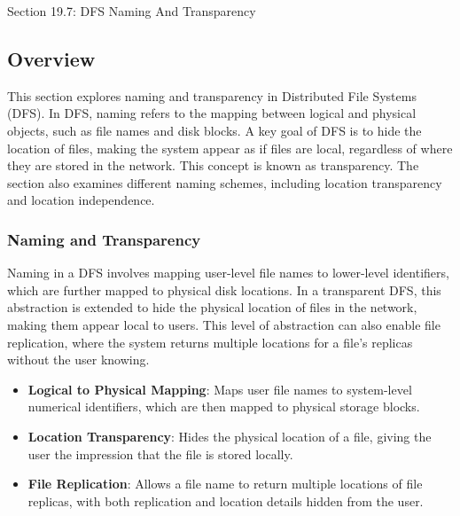 \begin{notes}{Section 19.7: DFS Naming And Transparency}
    \subsection*{Overview}

    This section explores naming and transparency in Distributed File Systems (DFS). In DFS, naming refers to the mapping between logical and physical objects, such as file names and disk blocks. A 
    key goal of DFS is to hide the location of files, making the system appear as if files are local, regardless of where they are stored in the network. This concept is known as transparency. The 
    section also examines different naming schemes, including location transparency and location independence.
    
    \subsubsection*{Naming and Transparency}
    
    Naming in a DFS involves mapping user-level file names to lower-level identifiers, which are further mapped to physical disk locations. In a transparent DFS, this abstraction is extended to hide 
    the physical location of files in the network, making them appear local to users. This level of abstraction can also enable file replication, where the system returns multiple locations for a 
    file's replicas without the user knowing.
    
    \begin{highlight}
    
        \begin{itemize}
            \item \textbf{Logical to Physical Mapping}: Maps user file names to system-level numerical identifiers, which are then mapped to physical storage blocks.
            \item \textbf{Location Transparency}: Hides the physical location of a file, giving the user the impression that the file is stored locally.
            \item \textbf{File Replication}: Allows a file name to return multiple locations of file replicas, with both replication and location details hidden from the user.
        \end{itemize}
    
    \end{highlight}
    

\end{notes}
